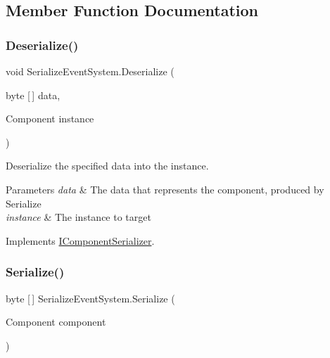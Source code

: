 \subsection{Member Function Documentation}
\mbox{\label{class_serialize_event_system_a27ee6101f51abf181d2bdf755708cdeb}} 
\subsubsection{\texorpdfstring{Deserialize()}{Deserialize()}}
{\footnotesize\ttfamily void Serialize\+Event\+System.\+Deserialize (\begin{DoxyParamCaption}\item[{byte \mbox{[}$\,$\mbox{]}}]{data,  }\item[{Component}]{instance }\end{DoxyParamCaption})\hspace{0.3cm}{\ttfamily [inline]}}



Deserialize the specified data into the instance. 


\begin{DoxyParams}{Parameters}
{\em data} & The data that represents the component, produced by Serialize \\
\hline
{\em instance} & The instance to target \\
\hline
\end{DoxyParams}


Implements \hyperlink{interface_i_component_serializer_a4cc366a5c78b33d47a90c209d8fed883}{I\+Component\+Serializer}.

\mbox{\label{class_serialize_event_system_a433cd679d73a8b4c4823e960b224231b}} 
\subsubsection{\texorpdfstring{Serialize()}{Serialize()}}
{\footnotesize\ttfamily byte \mbox{[}$\,$\mbox{]} Serialize\+Event\+System.\+Serialize (\begin{DoxyParamCaption}\item[{Component}]{component }\end{DoxyParamCaption})\hspace{0.3cm}{\ttfamily [inline]}}



